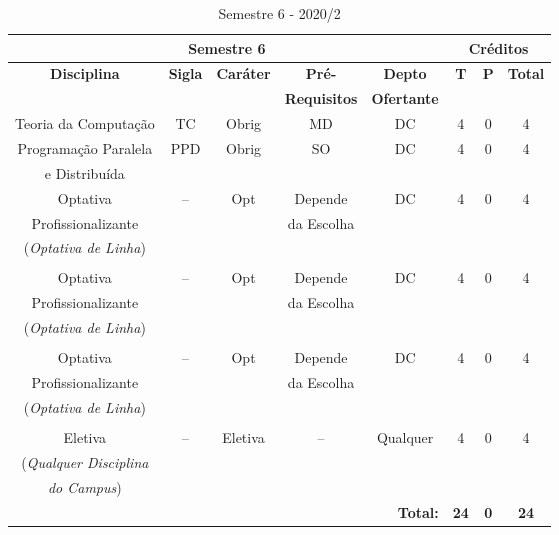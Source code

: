 
\begin{table}[H]
\caption{Semestre 6 - 2020/2}
\centering
\footnotesize
\begin{tabular}{|c|c|c|c|c|c|c|c|} %
\hline
\hline
\multicolumn{5}{|c|}{\textbf{Semestre 6}}  &  \multicolumn{3}{|c|}{\textbf{Créditos}} \\
\hline
\hline
\textbf{Disciplina} & \textbf{Sigla} & \textbf{Caráter} & \textbf{Pré-} & \textbf{Depto} &  \textbf{T}  &  \textbf{P}  & \textbf{Total} \\ 
& & & \textbf{Requisitos}  & \textbf{Ofertante} & & & \\
\hline 

Teoria da Computação & TC & Obrig & MD & DC & 4 & 0 & 4 \\
\hline

Programação Paralela & PPD & Obrig & SO & DC  & 4 & 0 & 4 \\
e Distribuída & & & & & & & \\
\hline

Optativa & --  & Opt & Depende & DC  & 4 & 0 & 4 \\
Profissionalizante & & & da Escolha & & & & \\
(\textit{Optativa de Linha}) & & & & & & & \\
 & & & & & & & \\
\hline

Optativa & --  & Opt & Depende & DC  & 4 & 0 & 4 \\
Profissionalizante & & & da Escolha & & & & \\
(\textit{Optativa de Linha}) & & & & & & & \\
 & & & & & & & \\
\hline

Optativa & --  & Opt & Depende & DC  & 4 & 0 & 4 \\
Profissionalizante & & & da Escolha & & & & \\
(\textit{Optativa de Linha}) & & & & & & & \\
 & & & & & & & \\
\hline

Eletiva  & --  & Eletiva & -- & Qualquer & 4 & 0 & 4 \\
(\textit{Qualquer Disciplina} & & & & & & & \\
\textit{do Campus}) & & & & & & & \\
\hline

\hline
\multicolumn{5}{|r|}{\textbf{Total:}}  &  \textbf{24}  &  \textbf{0}   & \textbf{24} \\ %
\hline
\hline
\end{tabular}
\label{tab:matriz4m}
\end{table}




